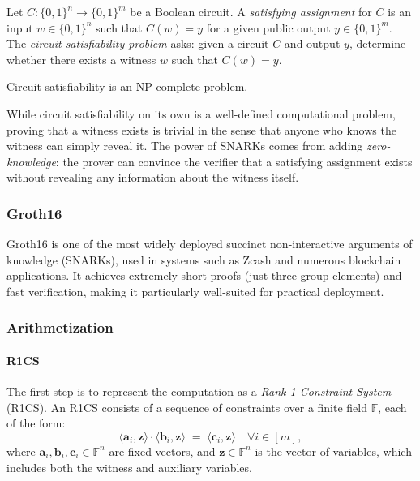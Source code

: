 \begin{definition}
Let $C: \{0,1\}^n \to \{0,1\}^m$ be a Boolean circuit. A \emph{satisfying assignment} for $C$ is an input $w \in \{0,1\}^n$ such that
$
C(w) = y
$
for a given public output $y \in \{0,1\}^m$. The \emph{circuit satisfiability problem} asks: given a circuit $C$ and output $y$, determine whether there exists a witness $w$ such that $C(w) = y$.
\end{definition}

\begin{remark}
Circuit satisfiability is an NP-complete problem.
\end{remark}

\begin{remark}
While circuit satisfiability on its own is a well-defined computational problem, 
proving that a witness exists is trivial in the sense that anyone who knows the witness 
can simply reveal it. The power of SNARKs comes from adding \emph{zero-knowledge}: 
the prover can convince the verifier that a satisfying assignment exists without revealing 
any information about the witness itself.
\end{remark}

\subsubsection{Groth16}

Groth16 \cite{groth2016} is one of the most widely deployed succinct non-interactive arguments of knowledge (SNARKs), 
used in systems such as Zcash and numerous blockchain applications. 
It achieves extremely short proofs (just three group elements) and fast verification, 
making it particularly well-suited for practical deployment. 

\subsubsection*{Arithmetization}

\paragraph{R1CS}
The first step is to represent the computation as a \emph{Rank-1 Constraint System} (R1CS).  
An R1CS consists of a sequence of constraints over a finite field $\mathbb{F}$, each of the form:
\[
\langle \mathbf{a}_i, \mathbf{z} \rangle \cdot 
\langle \mathbf{b}_i, \mathbf{z} \rangle \;=\; 
\langle \mathbf{c}_i, \mathbf{z} \rangle \quad \forall i \in [m],
\]
where $\mathbf{a}_i, \mathbf{b}_i, \mathbf{c}_i \in \mathbb{F}^n$ are fixed vectors, and $\mathbf{z} \in \mathbb{F}^n$ is the vector of variables, which includes both the witness and auxiliary variables.  

